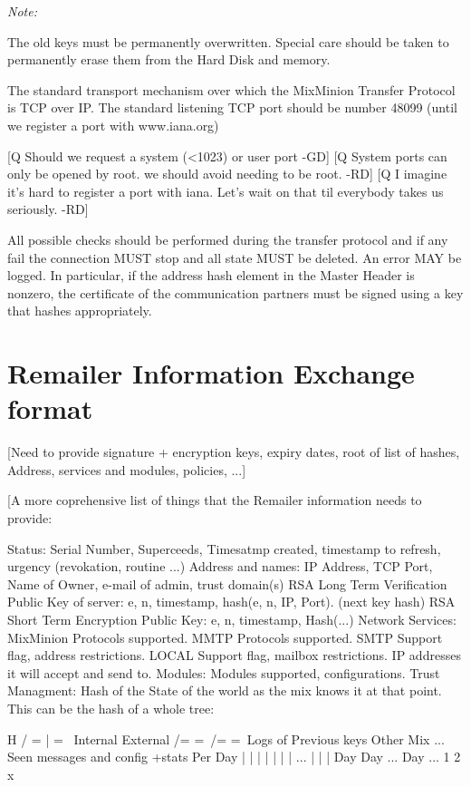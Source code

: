 \emph{Note:}

The old keys must be permanently overwritten. Special care should be
taken to permanently erase them from the Hard Disk and memory. 

The standard transport mechanism over which the MixMinion Transfer
Protocol is TCP over IP. The standard listening TCP port should be 
number 48099 (until we register a port with www.iana.org)

[Q Should we request a system (<1023) or user port -GD]
[Q System ports can only be opened by root. we should avoid needing
to be root. -RD]
[Q I imagine it's hard to register a port with iana. Let's wait on
that til everybody takes us seriously. -RD]

All possible checks should be performed during the transfer protocol
and if any fail the connection MUST stop and all state MUST
be deleted. An error MAY be logged. In particular, if the address
hash element in the Master Header is nonzero, the certificate of
the communication partners must be signed using a key that hashes
appropriately.

\section{Remailer Information Exchange format}

[Need to provide signature + encryption keys, expiry dates, root of
list of hashes, Address, services and modules, policies, ...]

[A more coprehensive list of things that the Remailer information
needs to provide:

Status: Serial Number, Superceeds, Timesatmp created, timestamp to
        refresh, urgency (revokation, routine ...)	  
Address and names: IP Address, TCP Port, Name of Owner, e-mail of
                   admin, trust domain(s) 
RSA Long Term Verification Public Key of server: e, n, timestamp,
                   hash(e, n, IP, Port). (next key hash)
RSA Short Term Encryption Public Key: e, n, timestamp, Hash(...)
Network Services: MixMinion Protocols supported.
		  MMTP Protocols supported.
	          SMTP Support flag, address restrictions.
                  LOCAL Support flag, mailbox restrictions.
	          IP addresses it will accept and send to.
Modules: Modules supported, configurations.
Trust Managment: Hash of the State of the world as the mix knows it at
        that point. This can be the hash of a whole tree:

		           H
             / =           |                   = \
	Internal                               External
 /=                  =\                     /=        =\
Logs of           Previous keys          Other Mix    ...
Seen messages     and config +stats       Per Day
|   |    |   |    |   |   |  ...          |   |   |
Day Day ...  Day  ...
1   2        x


